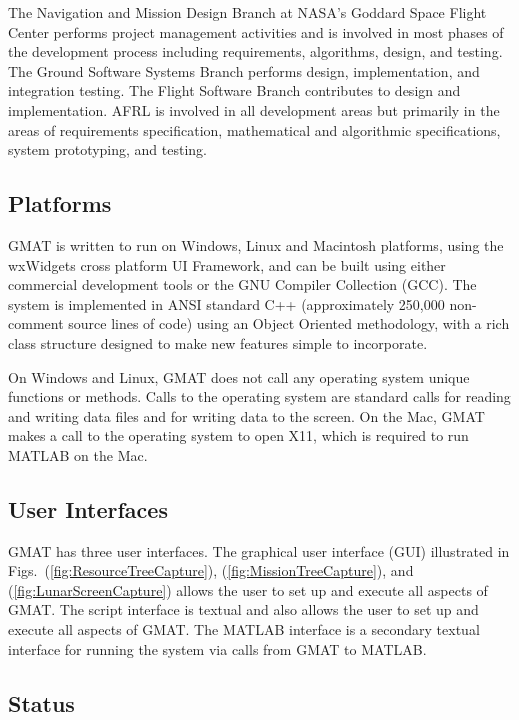 The Navigation and Mission Design Branch at NASA's Goddard Space Flight Center performs project management activities and is
involved in most phases of the development process including requirements,
algorithms, design, and testing. The Ground Software Systems Branch performs
design, implementation, and integration testing. The Flight Software Branch
contributes to design and implementation.  AFRL is involved in all development
areas but primarily in the areas of requirements specification, mathematical and
algorithmic specifications, system prototyping, and testing.

\subsection{Platforms}

GMAT is written to run on Windows, Linux and Macintosh platforms, using the
wxWidgets cross platform UI Framework, and can be built using either commercial
development tools or the GNU Compiler Collection (GCC). The system is
implemented in ANSI standard C++ (approximately 250,000 non-comment source lines
of code) using an Object Oriented methodology, with a rich class structure
designed to make new features simple to incorporate.

On Windows and Linux, GMAT does not call any operating system unique functions
or methods. Calls to the operating system are standard calls for reading and
writing data files and for writing data to the screen.  On the Mac, GMAT makes
a call to the operating system to open X11, which is required to run MATLAB on
the Mac.

\subsection{User Interfaces}

GMAT has three user interfaces. The graphical user interface (GUI) illustrated
in Figs.~(\ref{fig:ResourceTreeCapture}), (\ref{fig:MissionTreeCapture}), and
(\ref{fig:LunarScreenCapture}) allows the user to set up and execute all aspects
of GMAT.  The script interface is textual and also allows the user to set up and
execute all aspects of GMAT. The MATLAB interface is a secondary textual interface
for running the system via calls from GMAT to MATLAB.

\subsection{Status}

